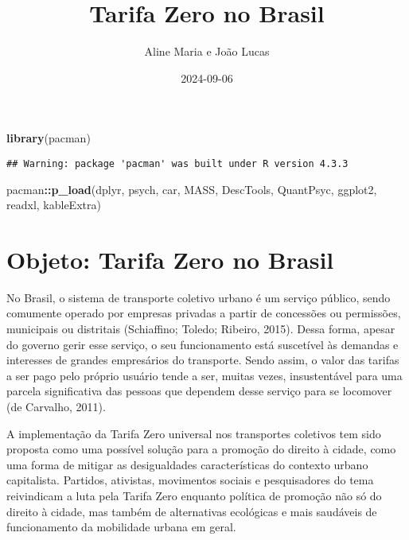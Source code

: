 \documentclass[
]{article}
\title{Tarifa Zero no Brasil}
\author{Aline Maria e João Lucas}
\date{2024-09-06}
\newenvironment{Shaded}{\begin{snugshade}}{\end{snugshade}}
\newcommand{\FunctionTok}[1]{\textcolor[rgb]{0.13,0.29,0.53}{\textbf{#1}}}
\newcommand{\NormalTok}[1]{#1}
\newcommand{\SpecialCharTok}[1]{\textcolor[rgb]{0.81,0.36,0.00}{\textbf{#1}}}
\begin{document}
\maketitle

{
\setcounter{tocdepth}{2}
\tableofcontents
}
\begin{Shaded}
\begin{Highlighting}[]
\FunctionTok{library}\NormalTok{(pacman)}
\end{Highlighting}
\end{Shaded}

\begin{verbatim}
## Warning: package 'pacman' was built under R version 4.3.3
\end{verbatim}

\begin{Shaded}
\begin{Highlighting}[]
\NormalTok{pacman}\SpecialCharTok{::}\FunctionTok{p\_load}\NormalTok{(dplyr, psych, car, MASS, DescTools, QuantPsyc, ggplot2, readxl, kableExtra)}
\end{Highlighting}
\end{Shaded}

\section{Objeto: Tarifa Zero no
Brasil}\label{objeto-tarifa-zero-no-brasil}

No Brasil, o sistema de transporte coletivo urbano é um serviço público,
sendo comumente operado por empresas privadas a partir de concessões ou
permissões, municipais ou distritais (Schiaffino; Toledo; Ribeiro,
2015). Dessa forma, apesar do governo gerir esse serviço, o seu
funcionamento está suscetível às demandas e interesses de grandes
empresários do transporte. Sendo assim, o valor das tarifas a ser pago
pelo próprio usuário tende a ser, muitas vezes, insustentável para uma
parcela significativa das pessoas que dependem desse serviço para se
locomover (de Carvalho, 2011).

A implementação da Tarifa Zero universal nos transportes coletivos tem
sido proposta como uma possível solução para a promoção do direito à
cidade, como uma forma de mitigar as desigualdades características do
contexto urbano capitalista. Partidos, ativistas, movimentos sociais e
pesquisadores do tema reivindicam a luta pela Tarifa Zero enquanto
política de promoção não só do direito à cidade, mas também de
alternativas ecológicas e mais saudáveis de funcionamento da mobilidade
urbana em geral.
\end{document}
